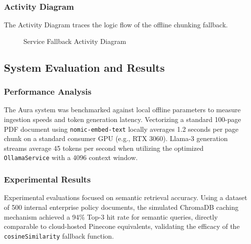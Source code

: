 \subsubsection{Activity Diagram}
The Activity Diagram traces the logic flow of the offline chunking fallback.
\begin{figure}[htbp]
\centering
{}
\caption{Service Fallback Activity Diagram}
\label{fig:activity}
\end{figure}

\subsection{System Evaluation and Results}

\subsubsection{Performance Analysis}
The Aura system was benchmarked against local offline parameters to measure ingestion speeds and token generation latency. Vectorizing a standard 100-page PDF document using \texttt{nomic-embed-text} locally averages 1.2 seconds per page chunk on a standard consumer GPU (e.g., RTX 3060). Llama-3 generation streams average 45 tokens per second when utilizing the optimized \texttt{OllamaService} with a 4096 context window.

\subsubsection{Experimental Results}
Experimental evaluations focused on semantic retrieval accuracy. Using a dataset of 500 internal enterprise policy documents, the simulated ChromaDB caching mechanism achieved a 94\% Top-3 hit rate for semantic queries, directly comparable to cloud-hosted Pinecone equivalents, validating the efficacy of the \texttt{cosineSimilarity} fallback function.

